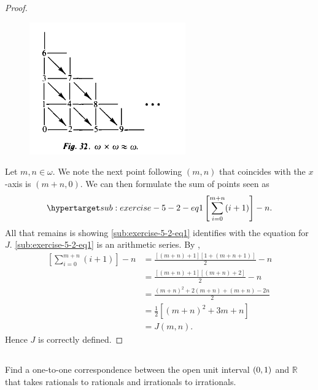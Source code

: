 \documentclass{report}
\begin{document}
  \begin{proof}
    \begin{figure}[ht]
      \label{sub:exercise-6-2-fig1}
      \includegraphics[width=0.6\textwidth]{fig-32}
      \centering
    \end{figure}
    Let $m, n \in \omega$.
    We note the next point following $(m, n)$ that coincides with the $x$-axis
      is $(m + n, 0)$.
    We can then formulate the sum of points seen as
      \begin{equation}
        \hyperlabel{sub:exercise-5-2-eq1}
        \left[ \sum_{i=0}^{m + n} (i + 1) \right] - n.
      \end{equation}
    All that remains is showing \eqref{sub:exercise-5-2-eq1} identifies with
      the equation for $J$.
    \eqref{sub:exercise-5-2-eq1} is an arithmetic series.
    By ,
      \begin{align*}
        \left[ \sum_{i=0}^{m + n} (i + 1) \right] - n
          & = \frac{[(m + n) + 1][1 + (m + n + 1)]}{2} - n \\
          & = \frac{[(m + n) + 1][(m + n) + 2]}{2} - n \\
          & = \frac{(m + n)^2 + 2(m + n) + (m + n) - 2n}{2} \\
          & = \frac{1}{2}[(m + n)^2 + 3m + n] \\
          & = J(m, n).
      \end{align*}
    Hence $J$ is correctly defined.
  \end{proof}

\subsection{}%

  Find a one-to-one correspondence between the open unit interval $\left(0, 1\right)$
    and $\mathbb{R}$ that takes rationals to rationals and irrationals to
    irrationals.
\end{document}

